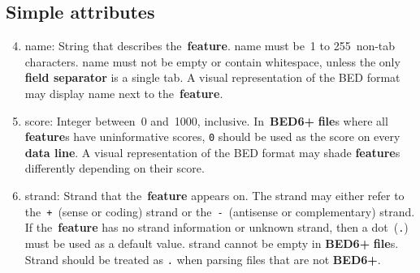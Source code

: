 \documentclass[11pt]{article}
\begin{document}
\subsection{Simple attributes}
\begin{enumerate}
  \setcounter{enumi}{3}

\item \textsf{name}: String that describes the~\textbf{feature}.
  \textsf{name} must be~1 to 255~non-tab characters.
  \textsf{name} must not be empty or contain whitespace, unless the only \textbf{field separator} is a single tab.
  A visual representation of the \ac{BED} format may display \textsf{name} next to the~\textbf{feature}.

\item \textsf{score}: Integer between~0 and~1000, inclusive.
  In~\textbf{BED6+} \textbf{file}s where all \textbf{feature}s have uninformative \textsf{score}s, \texttt{0} should be used as the \textsf{score} on every \textbf{data line}.
  A visual representation of the \ac{BED} format may shade \textbf{feature}s differently depending on their \textsf{score}.

\item \textsf{strand}: Strand that the~\textbf{feature} appears on.
  The \textsf{strand} may either refer to the~\texttt{+}~(sense or coding) strand or the~\texttt{-}~(antisense or complementary) strand.
  If the~\textbf{feature} has no \textsf{strand} information or unknown \textsf{strand}, then a dot~(\texttt{.}) must be used as a default value.
  \textsf{strand} cannot be empty in \textbf{BED6+} \textbf{file}s.
  \textsf{Strand} should be treated as \texttt{.} when parsing files that are not \textbf{BED6+}.
\end{enumerate}
\end{document}
